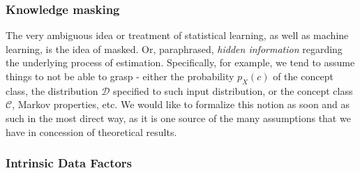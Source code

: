 \documentclass[10pt]{article} %
\begin{document}
\subsubsection{Knowledge masking}
The very ambiguous idea or treatment of statistical learning, as well as machine learning, is the idea of masked. Or, paraphrased, \textit{hidden information} regarding the underlying process of estimation. Specifically, for example, we tend to assume things to not be able to grasp - either the probability $p_{X}(c)$ of the concept class, the distribution $\mathcal{D}$ specified to such input distribution, or the concept class $\mathcal{C}$, Markov properties, etc. We would like to formalize this notion as soon and as such in the most direct way, as it is one source of the many assumptions that we have in concession of theoretical results. 
\subsubsection{Intrinsic Data Factors}
\end{document}
